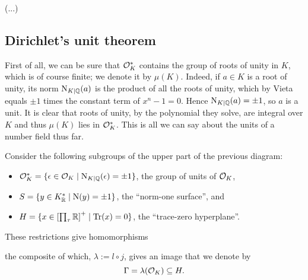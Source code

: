 (...)

\subsection{Dirichlet's unit theorem}

First of all, we can be sure that $\mathcal{O}^*_K$ contains the group of roots of unity in $K$, which is of course finite; we denote it by $\mu(K)$. Indeed, if $a\in K$ is a root of unity, its norm $\operatorname{N}_{K\mid\mathbb{Q}}(a)$ is the product of all the roots of unity, which by Vieta equals $\pm 1$ times the constant term of $x^n-1=0$. Hence $\operatorname{N}_{K\mid\mathbb{Q}}(a)=\pm 1$, so $a$ is a unit. It is clear that roots of unity, by the polynomial they solve, are integral over $K$ and thus $\mu(K)$ lies in $\mathcal{O}^*_K$. This is all we can say about the units of a number field thus far.

Consider the following subgroups of the upper part of the previous diagram:
\begin{itemize}
	\item $\mathcal{O}^*_K = \{\epsilon\in\mathcal{O}_K \mid \operatorname{N}_{K\mid\mathbb{Q}}(\epsilon) = \pm 1\}$, the group of units of $\mathcal{O}_K$,
	\item $S=\{y\in K^*_{\mathbb{R}} \mid \operatorname{N}(y)=\pm 1\}$, the ``norm-one surface'', and
	\item $H=\{x\in\left[\prod_\tau\mathbb{R}\right]^+ \mid \operatorname{Tr}(x)=0\}$, the ``trace-zero hyperplane''.
\end{itemize}

These restrictions give homomorphisms
\begin{center}
\end{center}
the composite of which, $\lambda := l\circ j$, gives an image that we denote by
\[
	\Gamma = \lambda(\mathcal{O}_K) \subseteq H.
\]

